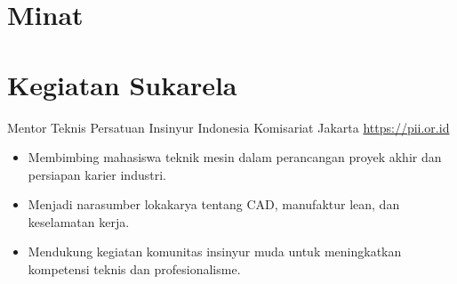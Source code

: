 \documentclass[a4paper, serif, 10pt]{moderncv}
\begin{document}
\section{Minat}

\section{Kegiatan Sukarela}

        {Mentor Teknis}
        {Persatuan Insinyur Indonesia Komisariat Jakarta}
        {\url{https://pii.or.id}}
        {}
        {\begin{itemize}
\item Membimbing mahasiswa teknik mesin dalam perancangan proyek akhir dan persiapan karier industri.
\item Menjadi narasumber lokakarya tentang CAD, manufaktur lean, dan keselamatan kerja.
\item Mendukung kegiatan komunitas insinyur muda untuk meningkatkan kompetensi teknis dan profesionalisme.
\end{itemize}}
    
\end{document}
